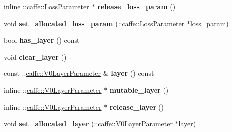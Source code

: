 \begin{DoxyCompactItemize}
inline \+::\mbox{\hyperlink{classcaffe_1_1_loss_parameter}{caffe\+::\+Loss\+Parameter}} $\ast$ {\bfseries release\+\_\+loss\+\_\+param} ()
\item 
\mbox{\label{classcaffe_1_1_v1_layer_parameter_a044fa4aedf5344ee0c1739c11889f697}} 
void {\bfseries set\+\_\+allocated\+\_\+loss\+\_\+param} (\+::\mbox{\hyperlink{classcaffe_1_1_loss_parameter}{caffe\+::\+Loss\+Parameter}} $\ast$loss\+\_\+param)
\item 
\mbox{\label{classcaffe_1_1_v1_layer_parameter_a915ffd74ce27cc2e1256eff93a9c3026}} 
bool {\bfseries has\+\_\+layer} () const
\item 
\mbox{\label{classcaffe_1_1_v1_layer_parameter_adeee0a04259bda344e9c7f94a13c5c40}} 
void {\bfseries clear\+\_\+layer} ()
\item 
\mbox{\label{classcaffe_1_1_v1_layer_parameter_ab015fc437b0a6e0c8297954e4a792e2c}} 
const \+::\mbox{\hyperlink{classcaffe_1_1_v0_layer_parameter}{caffe\+::\+V0\+Layer\+Parameter}} \& {\bfseries layer} () const
\item 
\mbox{\label{classcaffe_1_1_v1_layer_parameter_ae17b57a3cff82c9f1f80f571bad1734b}} 
inline \+::\mbox{\hyperlink{classcaffe_1_1_v0_layer_parameter}{caffe\+::\+V0\+Layer\+Parameter}} $\ast$ {\bfseries mutable\+\_\+layer} ()
\item 
\mbox{\label{classcaffe_1_1_v1_layer_parameter_a74e0cd907e55cb30a7fd2dc9bbbecfe1}} 
inline \+::\mbox{\hyperlink{classcaffe_1_1_v0_layer_parameter}{caffe\+::\+V0\+Layer\+Parameter}} $\ast$ {\bfseries release\+\_\+layer} ()
\item 
\mbox{\label{classcaffe_1_1_v1_layer_parameter_a19a323cb054ffaf55415f2050e6dc20e}} 
void {\bfseries set\+\_\+allocated\+\_\+layer} (\+::\mbox{\hyperlink{classcaffe_1_1_v0_layer_parameter}{caffe\+::\+V0\+Layer\+Parameter}} $\ast$layer)
\item 
\mbox{\label{classcaffe_1_1_v1_layer_parameter_a699a722645235ab060a5ce99691f8abc}} 

\end{DoxyCompactItemize}
